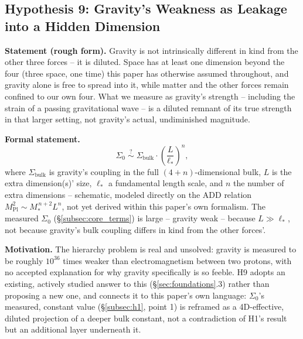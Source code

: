 \documentclass[12pt, a4paper]{article}
\begin{document}
\subsection{Hypothesis 9: Gravity's Weakness as Leakage into a Hidden Dimension}
\label{subsec:h9}
\textbf{Statement (rough form).} Gravity is not intrinsically
different in kind from the other three forces -- it is diluted. Space
has at least one dimension beyond the four (three space, one time)
this paper has otherwise assumed throughout, and gravity alone is free
to spread into it, while matter and the other forces remain confined
to our own four. What we measure as gravity's strength -- including
the strain of a passing gravitational wave -- is a diluted remnant of
its true strength in that larger setting, not gravity's actual,
undiminished magnitude.

\textbf{Formal statement.}
\begin{equation}
\Sigma_0 \;\overset{?}{\sim}\; \Sigma_{\text{bulk}}\cdot
\left(\frac{L}{\ell_\ast}\right)^{n},
\end{equation}
where $\Sigma_{\text{bulk}}$ is gravity's coupling in the full
$(4+n)$-dimensional bulk, $L$ is the extra dimension(s)' size,
$\ell_\ast$ a fundamental length scale, and $n$ the number of extra
dimensions -- schematic, modeled directly on the ADD relation
$M_{\mathrm{Pl}}^2 \sim M_\ast^{\,n+2}L^n$, not yet derived within
this paper's own formalism. The measured $\Sigma_0$
(\S\ref{subsec:core_terms}) is large -- gravity weak -- because
$L\gg\ell_\ast$, not because gravity's bulk coupling differs in kind
from the other forces'.

\textbf{Motivation.} The hierarchy problem is real and unsolved:
gravity is measured to be roughly $10^{36}$ times weaker than
electromagnetism between two protons, with no accepted explanation
for why gravity specifically is so feeble. H9 adopts an existing,
actively studied answer to this (\S\ref{sec:foundations}.3) rather
than proposing a new one, and connects it to this paper's own
language: $\Sigma_0$'s measured, constant value
(\S\ref{subsec:h1}, point 1) is reframed as a 4D-effective, diluted
projection of a deeper bulk constant, not a contradiction of H1's
result but an additional layer underneath it.
\end{document}
